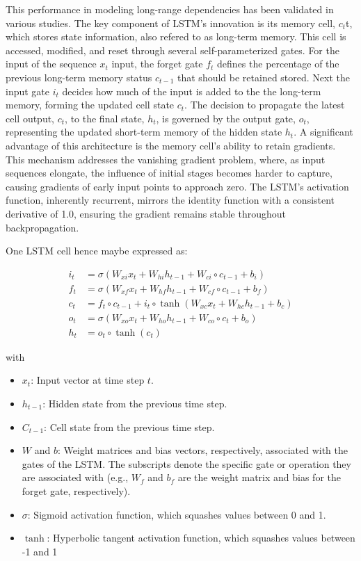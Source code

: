 \documentclass[
  letterpaper,
  DIV=11,
  numbers=noendperiod]{scrartcl}
\providecommand{\tightlist}{%
  \setlength{\itemsep}{0pt}\setlength{\parskip}{0pt}}\usepackage{longtable,booktabs,array}
\begin{document}
This performance in modeling long-range dependencies has been validated
in various studies. The key component of LSTM's innovation is its memory
cell, \(c_t\)t, which stores state information, also refered to as
long-term memory. This cell is accessed, modified, and reset through
several self-parameterized gates. For the input of the sequence \(x_t\)
input, the forget gate \(f_t\) defines the percentage of the previous
long-term memory status \(c_{t-1}\) that should be retained
stored\hspace{0pt}. Next the input gate \(i_t\) decides how much of the
input is added to the the long-term memory, forming the updated cell
state \(c_{t}\). The decision to propagate the latest cell output,
\(c_t\), to the final state, \(h_t\), is governed by the output gate,
\(o_t\), representing the updated short-term memory of the hidden state
\(h_t\). A significant advantage of this architecture is the memory
cell's ability to retain gradients. This mechanism addresses the
vanishing gradient problem, where, as input sequences elongate, the
influence of initial stages becomes harder to capture, causing gradients
of early input points to approach zero. The LSTM's activation function,
inherently recurrent, mirrors the identity function with a consistent
derivative of 1.0, ensuring the gradient remains stable throughout
backpropagation.

One LSTM cell hence maybe expressed as:

\[
\begin{aligned}
i_t &= \sigma(W_{xi} x_t + W_{hi} h_{t-1} + W_{ci} \circ c_{t-1} + b_i) \\
f_t &= \sigma(W_{xf} x_t + W_{hf} h_{t-1} + W_{cf} \circ c_{t-1} + b_f) \\
c_t &= f_t \circ c_{t-1} + i_t \circ \tanh(W_{xc} x_t + W_{hc} h_{t-1} + b_c) \\
o_t &= \sigma(W_{xo} x_t + W_{ho} h_{t-1} + W_{co} \circ c_t + b_o) \\
h_t &= o_t \circ \tanh(c_t)
\end{aligned}
\]

with

\begin{itemize}
\tightlist
\item
  \(x_t\): Input vector at time step \(t\).
\item
  \(h_{t-1}\): Hidden state from the previous time step.
\item
  \(C_{t-1}\): Cell state from the previous time step.
\item
  \(W\) and \(b\): Weight matrices and bias vectors, respectively,
  associated with the gates of the LSTM. The subscripts denote the
  specific gate or operation they are associated with (e.g., \(W_f\) and
  \(b_f\) are the weight matrix and bias for the forget gate,
  respectively).
\item
  \(\sigma\): Sigmoid activation function, which squashes values between
  0 and 1.
\item
  \(\tanh\): Hyperbolic tangent activation function, which squashes
  values between -1 and 1
\end{itemize}
\end{document}
